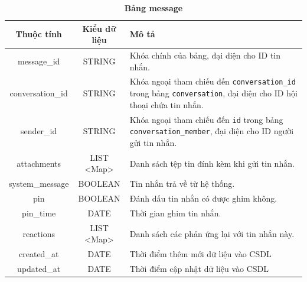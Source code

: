 \begin{table}[H]
  \caption{\bfseries \fontsize{12pt}{0pt}\selectfont Bảng message}
  \centering
  \begin{tabularx}{0.9\textwidth}{|c|c|X|}
    \hline
    \textbf{Thuộc tính} & \textbf{Kiểu dữ liệu} & \textbf{Mô tả} \\
    \hline
    message\_id & STRING & Khóa chính của bảng, đại diện cho ID tin nhắn. \\
    \hline
    conversation\_id & STRING & Khóa ngoại tham chiếu đến \texttt{conversation\_id} trong bảng \texttt{conversation}, đại diện cho ID hội thoại chứa tin nhắn. \\
    \hline
    sender\_id & STRING & Khóa ngoại tham chiếu đến \texttt{id} trong bảng \texttt{conversation\_member}, đại diện cho ID người gửi tin nhắn. \\
    \hline
    attachments & LIST <Map> & Danh sách tệp tin đính kèm khi gửi tin nhắn.\\
    \hline
    system\_message & BOOLEAN & Tin nhắn trả về từ hệ thống.\\
    \hline
    pin & BOOLEAN & Đánh dấu tin nhắn có được ghim không.\\
    \hline
    pin\_time & DATE & Thời gian ghim tin nhắn.\\
    \hline
    reactions & LIST <Map> & Danh sách các phản ứng lại với tin nhắn này.\\
    \hline
    created\_at & DATE & Thời điểm thêm mới dữ liệu vào CSDL \\
    \hline
    updated\_at & DATE & Thời điểm cập nhật dữ liệu vào CSDL \\
    \hline
  \end{tabularx}
\end{table}


